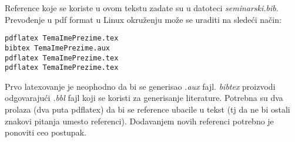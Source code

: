 \documentclass[a4paper]{article}
\newtheorem{primer}{Primer}[section]
\begin{document}
Reference koje se koriste u ovom tekstu zadate su u datoteci {\em seminarski.bib}. Prevođenje u pdf format u Linux okruženju može se uraditi na sledeći način:
\begin{verbatim}
pdflatex TemaImePrezime.tex 
bibtex TemaImePrezime.aux 
pdflatex TemaImePrezime.tex 
pdflatex TemaImePrezime.tex 
\end{verbatim}
Prvo latexovanje je neophodno da bi se generisao {\em .aux} fajl. {\em bibtex} proizvodi odgovarajući {\em .bbl} fajl koji se koristi za generisanje literature. 
Potrebna su dva prolaza (dva puta pdflatex) da bi se reference ubacile u tekst (tj da ne bi ostali znakovi pitanja umesto referenci). Dodavanjem novih referenci potrebno je ponoviti ceo postupak.  


















\end{document}
